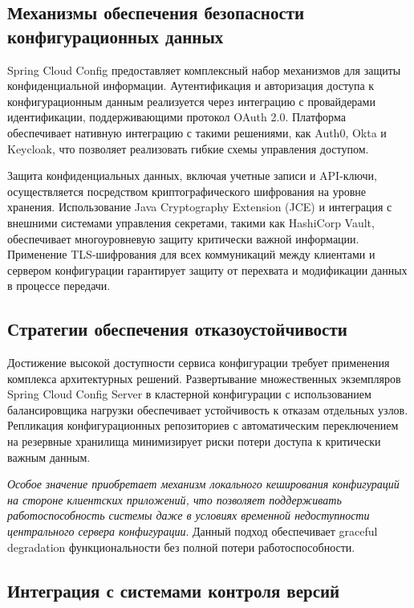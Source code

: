 \subsection{Механизмы обеспечения безопасности конфигурационных данных}

Spring Cloud Config предоставляет комплексный набор механизмов для защиты конфиденциальной информации. Аутентификация и авторизация доступа к конфигурационным данным реализуется через интеграцию с провайдерами идентификации, поддерживающими протокол OAuth 2.0. Платформа обеспечивает нативную интеграцию с такими решениями, как Auth0, Okta и Keycloak, что позволяет реализовать гибкие схемы управления доступом.

Защита конфиденциальных данных, включая учетные записи и API-ключи, осуществляется посредством криптографического шифрования на уровне хранения. Использование Java Cryptography Extension (JCE) и интеграция с внешними системами управления секретами, такими как HashiCorp Vault, обеспечивает многоуровневую защиту критически важной информации. Применение TLS-шифрования для всех коммуникаций между клиентами и сервером конфигурации гарантирует защиту от перехвата и модификации данных в процессе передачи.

\subsection{Стратегии обеспечения отказоустойчивости}

Достижение высокой доступности сервиса конфигурации требует применения комплекса архитектурных решений. Развертывание множественных экземпляров Spring Cloud Config Server в кластерной конфигурации с использованием балансировщика нагрузки обеспечивает устойчивость к отказам отдельных узлов. Репликация конфигурационных репозиториев с автоматическим переключением на резервные хранилища минимизирует риски потери доступа к критически важным данным.

\textit{Особое значение приобретает механизм локального кеширования конфигураций на стороне клиентских приложений, что позволяет поддерживать работоспособность системы даже в условиях временной недоступности центрального сервера конфигурации}. Данный подход обеспечивает graceful degradation функциональности без полной потери работоспособности.
\subsection{Интеграция с системами контроля версий}

